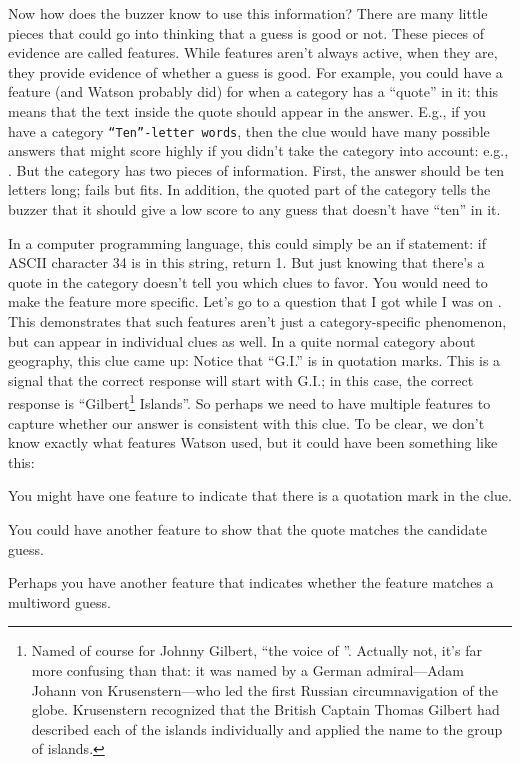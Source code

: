 Now how does the buzzer know to use this information?
%
There are many little pieces that could go into thinking that a guess is good
or not.
%
These pieces of evidence are called features.
%
While features aren’t
always active, when they are, they provide evidence of whether a guess is
good.
%
For example, you could have a feature (and Watson probably did) for
when a category has a ``quote'' in it: this means that the text inside the
quote should appear in the answer.
%
E.g., if you have a category \texttt{``Ten''-letter words}, then the clue
would have many possible answers that might score highly if you didn't take
the category into account: e.g., .
%
But the category has two pieces of information.
%
First, the answer should be ten
letters long;  fails but  fits.
%
In addition, the quoted part of the category tells the buzzer that it
should give a low score to any guess that doesn't have ``ten'' in it.

In a computer programming language, this could simply be an if statement: if
ASCII character 34 is in this string, return 1.
%
But just knowing that there's a quote in the category doesn't tell you
which clues to favor.
%
You would need to make the feature more specific.
Let's go to a question that I got while I was on \jeopardy{}.
%
This demonstrates that such features aren't just a category-specific
phenomenon, but can appear in individual clues as well.
%
In a quite normal category about
geography, this clue came up:
Notice that ``G.I.'' is in quotation marks.
%
This is a signal that the correct response will start with G.I.; in
this case, the correct response is ``Gilbert\footnote{Named of course
for Johnny Gilbert, ``the voice of \jeopardy{}''.  Actually not, it's
far more confusing than that: it was named by a German admiral---Adam
Johann von Krusenstern---who led the first Russian circumnavigation of
the globe.  Krusenstern recognized that the British Captain Thomas
Gilbert had described each of the islands individually and applied the
name to the group of islands.}
Islands''.
%
So perhaps we need to have multiple features to capture whether our answer is
consistent with this clue.
%
To be clear, we don’t know exactly what features Watson used, but it could
have been something like this:
\begin{itemize*}
  \item You might have one feature to indicate that there is a quotation mark
    in the clue.
    \item You could have another feature to show that the quote matches the
      candidate guess.
      \item Perhaps you have another feature that indicates whether the
        feature matches a multiword guess.
\end{itemize*}

